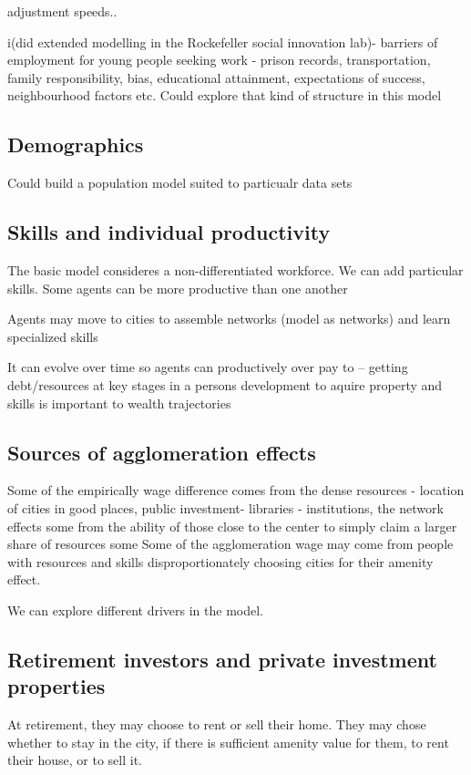 adjustment speeds..
 
i(did extended modelling in the Rockefeller social innovation lab)- barriers of employment for young people seeking work
- prison records, transportation, family responsibility, bias, educational attainment, expectations of success, neighbourhood factors etc.
Could explore that kind of structure in this model

\subsection{Demographics}
Could build a population model suited to particualr data sets %

\subsection{Skills and individual productivity}
The basic model consideres a non-differentiated workforce. We can add particular skills.
Some agents can be more productive than one another

Agents may move to cities to assemble networks (model as networks)
and learn specialized skills

It can evolve over time so agents can productively over pay to  
-- getting debt/resources at key stages in a persons development to aquire property and skills is important to \gls{wealth trajectories}


\subsection{Sources of agglomeration effects}
Some of the empirically wage difference comes from the dense resources  - location of cities in good places, public investment- libraries - institutions, the network effects
some from the ability of those close to the center to simply claim a larger share of resources
some 
Some of the agglomeration wage may come from people with resources and skills disproportionately choosing cities for their amenity effect. 

We can explore different drivers in the model.

\subsection{Retirement investors and private investment properties}

At retirement,  they may choose to rent or sell their home. They may chose whether to stay in the city, if there is sufficient amenity value for them, to rent their house, or to sell it. 

